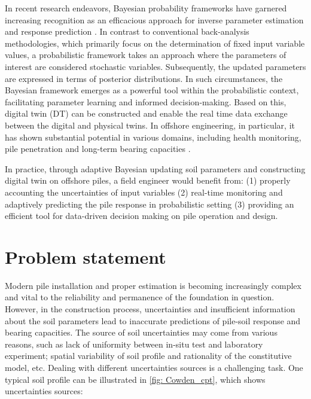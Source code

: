 In recent research endeavors, Bayesian probability frameworks have garnered increasing recognition as an efficacious approach for inverse parameter estimation and response prediction \citep{finno2005,nakamura2011,hsein2013,nguyen2016,wagner2020,jin2021,tao2021,buckley2023,tang2023}. In contrast to conventional back-analysis methodologies, which primarily focus on the determination of fixed input variable values, a probabilistic framework takes an approach where the parameters of interest are considered stochastic variables. Subsequently, the updated parameters are expressed in terms of posterior distributions. In such circumstances, the Bayesian framework emerges as a powerful tool within the probabilistic context, facilitating parameter learning and informed decision-making. Based on this, digital twin (DT) can be constructed and enable the real time data exchange between the digital and physical twins. In offshore engineering, in particular, it has shown substantial potential in various domains, including health monitoring, pile penetration and long-term bearing capacities \citep{wang2021,zhao2023,stuyts2023}. 

In practice, through adaptive Bayesian updating soil parameters and constructing digital twin on offshore piles, a field engineer would benefit from: (1) properly accounting the uncertainties of input variables (2) real-time monitoring and adaptively predicting the pile response in probabilistic setting (3) providing an efficient tool for data-driven decision making on pile operation and design.



\section{Problem statement}

Modern pile installation and proper estimation is becoming increasingly complex and vital to the reliability and permanence of the foundation in question. However, in the construction process, uncertainties and insufficient information about the soil parameters lead to inaccurate predictions of pile-soil response and bearing capacities. The source of soil uncertainties may come from various reasons, such as lack of uniformity between in-situ test and laboratory experiment; spatial variability of soil profile and rationality of the constitutive model, etc. Dealing with different uncertainties sources is a challenging task. One typical soil profile can be illustrated in \cref{fig: Cowden_cpt}, which shows uncertainties sources:

